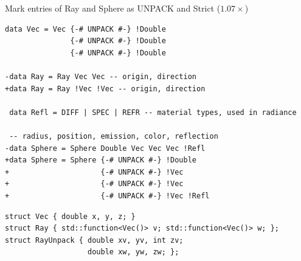 \documentclass[8pt]{beamer}
\begin{document}
\begin{frame}[fragile]{Mark entries of Ray and Sphere as UNPACK and Strict ($1.07\times$)}

\begin{verbatim}
data Vec = Vec {-# UNPACK #-} !Double 
               {-# UNPACK #-} !Double 
               {-# UNPACK #-} !Double

-data Ray = Ray Vec Vec -- origin, direction
+data Ray = Ray !Vec !Vec -- origin, direction

 data Refl = DIFF | SPEC | REFR -- material types, used in radiance

 -- radius, position, emission, color, reflection
-data Sphere = Sphere Double Vec Vec Vec !Refl
+data Sphere = Sphere {-# UNPACK #-} !Double 
+                     {-# UNPACK #-} !Vec 
+                     {-# UNPACK #-} !Vec 
+                     {-# UNPACK #-} !Vec !Refl
\end{verbatim}

\begin{verbatim}
struct Vec { double x, y, z; }
struct Ray { std::function<Vec()> v; std::function<Vec()> w; };
struct RayUnpack { double xv, yv, int zv;
                   double xw, yw, zw; };
\end{verbatim}

\end{frame}
\end{document}
